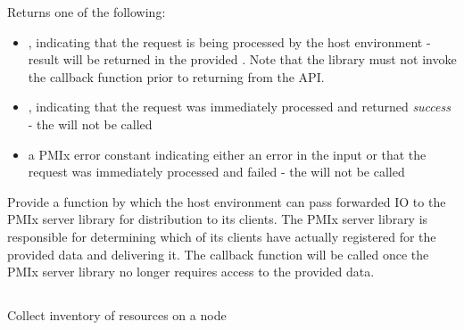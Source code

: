 \begin{arglist}
\end{arglist}

Returns one of the following:

\begin{itemize}
    \item {}, indicating that the request is being processed by the host environment - result will be returned in the provided . Note that the library must not invoke the callback function prior to returning from the \ac{API}.
    \item {}, indicating that the request was immediately processed and returned \textit{success} - the  will not be called
    \item a PMIx error constant indicating either an error in the input or that the request was immediately processed and failed - the  will not be called
\end{itemize}

\descr

Provide a function by which the host environment can pass forwarded \ac{IO} to the \ac{PMIx} server library for distribution to its clients. The \ac{PMIx} server library is responsible for determining which of its clients have actually registered for the provided data and delivering it. The  callback function will be called once the \ac{PMIx} server library no longer requires access to the provided data.

\subsection{}

\summary

Collect inventory of resources on a node

